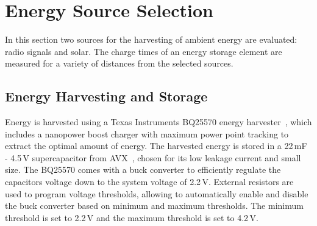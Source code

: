 \section{Energy Source Selection}
\label{sec:pre_energy_source_selection}

In this section two sources for the harvesting of ambient energy are evaluated: radio signals and solar.
The charge times of an energy storage element are measured for a variety of distances from the selected sources.






\subsection{Energy Harvesting and Storage}
\label{sec:pre_energy_harvesting_storage}
Energy is harvested using a Texas Instruments BQ25570 energy harvester~\cite{bq25570_2017}, which includes a nanopower boost charger with maximum power point tracking to extract the optimal amount of energy. 
The harvested energy is stored in a 22\,mF - 4.5\,V supercapacitor from AVX~\cite{avx_bestcap_2017}, chosen for its low leakage current and small size.
The BQ25570 comes with a buck converter to efficiently regulate the capacitors voltage down to the system voltage of 2.2\,V.
External resistors are used to program voltage thresholds, allowing to automatically enable and disable the buck converter based on minimum and maximum thresholds.
The minimum threshold is set to 2.2\,V and the maximum threshold is set to 4.2\,V.

